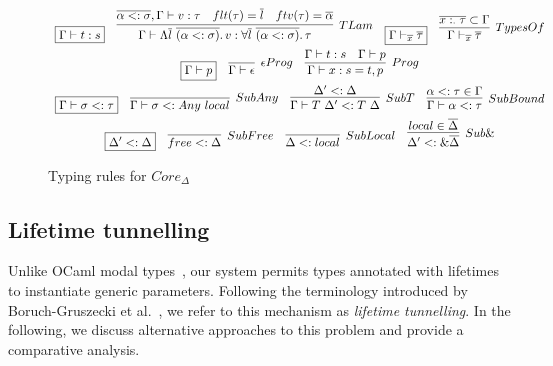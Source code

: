 \documentclass[acmsmall]{acmart}
\newcommand{\mathframebox}[1]{\framebox{$\displaystyle #1$}}
\newcommand{\ap}{~}
\begin{document}
\begin{figure}
\begin{gather*}
\begin{array}{cccc}
            \mathframebox{\Gamma\vdash t : s} &
            \infer[TLam]{
                \Gamma\vdash\Lambda\overline{l}\ap\overline{(\alpha <: \sigma)}\ldotp v : \forall\overline{l}\ap\overline{(\alpha <: \sigma)}\ldotp\tau
            }{
                \overline{\alpha <: \sigma}, \Gamma\vdash v : \tau & flt(\tau) = \overline{l} & ftv(\tau) = \overline{\alpha}
            } &
            \mathframebox{\Gamma\vdash_{\overline{x}}\overline{\tau}}
            &
            \infer[TypesOf]{\Gamma\vdash_{\overline{x}}\overline{\tau}}{\overline{x :_\cdot \tau} \subset \Gamma}
        \end{array} \\
        \begin{array}{ccc}
            \mathframebox{\Gamma\vdash p} &
            \infer[\epsilon Prog]{\Gamma\vdash\epsilon}{} &
            \infer[Prog]{\Gamma\vdash x : s = t, p}{\Gamma\vdash t : s & \Gamma\vdash p}
        \end{array}\\
        \begin{array}{cccc}
            \mathframebox{\Gamma\vdash \sigma <: \tau} &
            \infer[SubAny]{\Gamma\vdash \sigma <: Any\ap local}{} &
            \infer[SubT]{\Gamma\vdash T\ap\Delta' <: T\ap\Delta}{\Delta' <: \Delta} &
            \infer[SubBound]{\Gamma\vdash \alpha <: \tau}{\alpha <: \tau \in \Gamma}
        \end{array} \\
        \begin{array}{cccc}
            \mathframebox{\Delta' <: \Delta} &
            \infer[SubFree]{free <: \Delta}{} &
            \infer[SubLocal]{\Delta <: local}{} &
            \infer[Sub\&]{\Delta' <: \&\overline{\Delta}}{local\in\overline{\Delta}}
        \end{array}
    \end{gather*}
    \caption{Typing rules for $Core_{\Delta}$}
    \label{fig:core-delta-typing}
\end{figure}

\subsection{Lifetime tunnelling}

Unlike OCaml modal types~\cite{lorenzen2024oxidizing}, our system permits types annotated with lifetimes to instantiate generic parameters.
Following the terminology introduced by Boruch-Gruszecki et al.~\cite{boruch2023capturing}, we refer to this mechanism as \emph{lifetime tunnelling}.
In the following, we discuss alternative approaches to this problem and provide a comparative analysis. %
\end{document}
